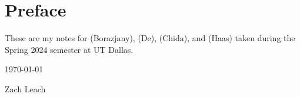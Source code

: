 \chapter*{Preface}

These are my notes for  (Borazjany),  (De),  (Chida), and  (Haas) taken during the Spring 2024 semester at UT Dallas.

\vspace{12pt}
\hfill \today 

\hfill Zach Leach


